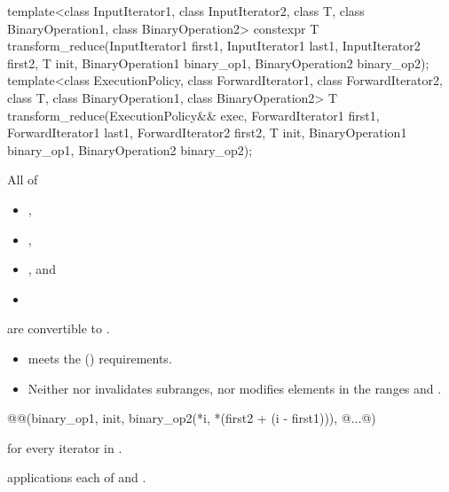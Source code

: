 %
\begin{itemdecl}
template<class InputIterator1, class InputIterator2, class T,
         class BinaryOperation1, class BinaryOperation2>
  constexpr T transform_reduce(InputIterator1 first1, InputIterator1 last1,
                               InputIterator2 first2,
                               T init,
                               BinaryOperation1 binary_op1,
                               BinaryOperation2 binary_op2);
template<class ExecutionPolicy,
         class ForwardIterator1, class ForwardIterator2, class T,
         class BinaryOperation1, class BinaryOperation2>
  T transform_reduce(ExecutionPolicy&& exec,
                     ForwardIterator1 first1, ForwardIterator1 last1,
                     ForwardIterator2 first2,
                     T init,
                     BinaryOperation1 binary_op1,
                     BinaryOperation2 binary_op2);
\end{itemdecl}

\begin{itemdescr}
\pnum
\mandates
All of
  \begin{itemize}
  \item {},
  \item {},
  \item {}, and
  \item {}
  \end{itemize}
  are convertible to .

\pnum
\expects
\begin{itemize}
\item
   meets the  () requirements.
\item
  Neither  nor 
  invalidates subranges, nor modifies elements in the ranges
   and .
\end{itemize}

\pnum
\returns
\begin{codeblock}
@@(binary_op1, init, binary_op2(*i, *(first2 + (i - first1))), @$\dotsc$@)
\end{codeblock}
for every iterator  in .

\pnum
\complexity
{} applications each
of  and .
\end{itemdescr}

